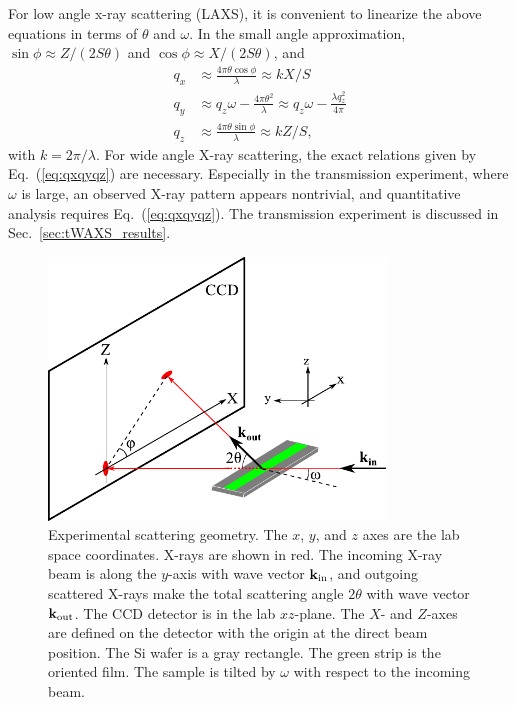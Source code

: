 For low angle x-ray scattering (LAXS), it is convenient to linearize the above
equations in terms of $\theta$ and $\omega$. In the small angle approximation, 
$\sin\phi \approx Z/(2S\theta)$ and $\cos\phi \approx X/(2S\theta)$, and
\begin{align}
  q_x &\approx \frac{4\pi\theta\cos\phi}{\lambda} \approx kX/S \nonumber\\
  q_y &\approx q_z\omega -\frac{4\pi\theta^2}{\lambda} \approx q_z\omega - \frac{\lambda q_z^2}{4\pi}\nonumber\\
  q_z &\approx \frac{4\pi\theta\sin\phi}{\lambda} \approx kZ/S,
  \label{eq:qxqyqz_small}
\end{align}
with $k=2\pi/\lambda$. For wide angle X-ray scattering, the exact relations given
by Eq.~(\ref{eq:qxqyqz}) are necessary. Especially in the transmission experiment,
where $\omega$ is large, an observed X-ray pattern appears nontrivial, and 
quantitative analysis requires Eq.~(\ref{eq:qxqyqz}).
The transmission experiment is discussed in Sec.~\ref{sec:tWAXS_results}.

\begin{figure}[htbp]
  \centering
  \includegraphics[width=0.8\textwidth]{figures/ripple/analysis/laxs_setup}
  \caption{Experimental scattering geometry.
  The $x$, $y$, and $z$ axes are the lab space coordinates. 
  X-rays are shown in red. The incoming X-ray beam is along the $y$-axis with
  wave vector $\mathbf{k}_{\mathrm{in}}$, and outgoing scattered X-rays make the total scattering
  angle $2\theta$ with wave vector $\mathbf{k}_{\mathrm{out}}$.
  The CCD detector is in the lab $xz$-plane. The $X$- and $Z$-axes are 
  defined on the detector with the origin at the direct beam position. 
  The Si wafer is a gray rectangle.
  The green strip is the oriented film. The sample is tilted by $\omega$
  with respect to the incoming beam. 
  }
  \label{fig:laxs_setup}
\end{figure}

